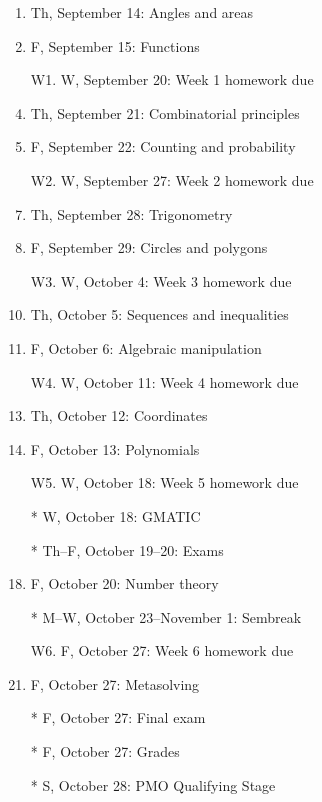 \documentclass[10pt,paper=letter]{scrartcl}
\begin{document}
\begin{multicols}{2}

\begin{enumerate}

\item Th, September 14: Angles and areas

\item F, September 15: Functions

\item[W1.] W, September 20: Week 1 homework due

\item Th, September 21: Combinatorial principles

\item F, September 22: Counting and probability

\item[W2.] W, September 27: Week 2 homework due

\item Th, September 28: Trigonometry

\item F, September 29: Circles and polygons

\item[W3.] W, October 4: Week 3 homework due

\item Th, October 5: Sequences and inequalities

\item F, October 6: Algebraic manipulation

\item[W4.] W, October 11: Week 4 homework due

\item Th, October 12: Coordinates

\item F, October 13: Polynomials

\item[W5.] W, October 18: Week 5 homework due

\item[*] W, October 18: GMATIC

\item[*] Th--F, October 19--20: Exams

\item F, October 20: Number theory

\item[*] M--W, October 23--November 1: Sembreak

\item[W6.] F, October 27: Week 6 homework due

\item F, October 27: Metasolving

\item[*] F, October 27: Final exam

\item[*] F, October 27: Grades

\item[*] S, October 28: PMO Qualifying Stage

\end{enumerate}
  
\end{multicols}
\end{document}
